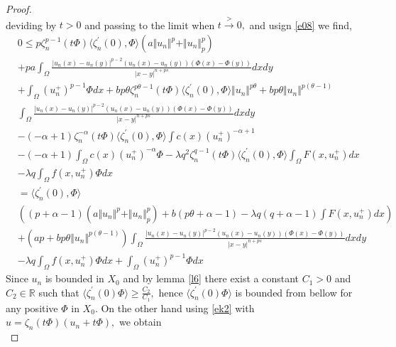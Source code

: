\documentclass[10pt,twoside,reqno,centertags,draft]{amsart}
\begin{document}
\begin{proof}
\begin{equation}
\end{equation} 
deviding by $ t >0$ and passing to the limit when $ t \xrightarrow{>} 0,$ and usign \ref{e08} we find,
\begin{equation}
\begin{aligned}
& 0\leq p\zeta^{p-1}_{n}(t\Phi)\langle \zeta^{\prime}_{n}(0), \Phi\rangle\left( a \Vert u_n \Vert^p + \Vert u_n \Vert_{p}^{p}\right)\\
&+pa\int_{\Omega}\frac{\vert u_n(x) -u_n(y)\vert^{p-2}(u_n(x) -u_n(y))(\Phi(x) -\Phi(y))}{\vert x -y\vert^{n  +ps}}dxdy \\
&+\int_{\Omega}(u_n^+)^{p -1}\Phi dx +b p\theta\zeta^{p\theta-1}_{n}(t\Phi)\langle \zeta^{\prime}_{n}(0), \Phi\rangle\Vert u_n \Vert^{p\theta} 
+b p\theta\Vert u_n\Vert^{p(\theta -1)}\\
&\int_{\Omega}\frac{\vert u_n(x) -u_n(y)\vert^{p-2}(u_n(x) -u_n(y))(\Phi(x) -\Phi(y))}{\vert x -y\vert^{n  +ps}}dxdy\\
&-(-\alpha +1)\zeta^{-\alpha}_{n}(t\Phi)\langle \zeta^{\prime}_{n}(0), \Phi\rangle\int c(x)(u_n^+)^{-\alpha+1}\\
& -(-\alpha +1)\int_{\Omega}c(x)(u_n^+)^{-\alpha}\Phi -\lambda q^{2}\zeta^{q-1}_{n}(t\Phi)\langle \zeta^{\prime}_{n}(0), \Phi\rangle\int_{\Omega}F(x,u_n^+)dx\\
&-\lambda q\int_{\Omega}f(x,u_n^+)\Phi dx\\
&= \langle \zeta^{\prime}_{n}(0), \Phi\rangle\\
&\left( (p +\alpha -1)\left( a \Vert u_n \Vert^p + \Vert u_n \Vert_{p}^{p}\right) +b(p\theta +\alpha -1) -\lambda q(q +\alpha -1)\int F(x,u_n^+)dx\right)\\
& +\left(a p +b p\theta\Vert u_n\Vert^{p(\theta -1)}\right)\int_{\Omega}\frac{\vert u_n(x) -u_n(y)\vert^{p-2}(u_n(x) -u_n(y))(\Phi(x) -\Phi(y))}{\vert x -y\vert^{n  +ps}}dxdy \\
&-\lambda q\int_{\Omega}f(x,u_n^+)\Phi dx +\int_{\Omega}(u_n^+)^{p -1}\Phi dx
\end{aligned}
\end{equation}
Since $ u_n$ is bounded in $ X_0$ and by lemma \ref{l6} there exist a constant 
$ C_1 >0$ and $ C_2 \in \mathbb{R}$ such that $ \langle \zeta^{\prime}_{n}(0) \Phi\rangle \geq \frac{C_2}{C_1},$ 
hence $ \langle \zeta^{\prime}_{n}(0) \Phi\rangle$ is bounded from bellow for any positive $ \Phi$ in $ X_0.$\newline
On the other hand using \ref{ek2} with $ u =\zeta_n(t\Phi)(u_n +t\Phi),$ we obtain
\begin{equation}

\end{equation}
\end{proof}
\end{document}
